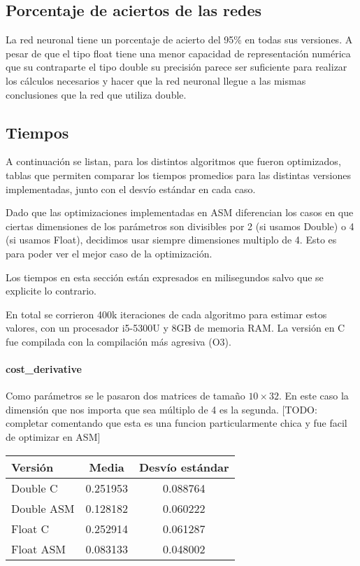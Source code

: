 \subsection{Porcentaje de aciertos de las redes}

La red neuronal tiene un porcentaje de acierto del 95\% en todas sus versiones. A pesar de que el tipo float tiene una menor capacidad de representación numérica que su contraparte el tipo double su precisión parece ser suficiente para realizar los cálculos necesarios y hacer que la red neuronal llegue a las mismas conclusiones que la red que utiliza double.


\subsection{Tiempos}

A continuación se listan, para los distintos algoritmos que fueron optimizados, tablas que permiten comparar los tiempos promedios para las distintas versiones implementadas, junto con el desvío estándar en cada caso.

Dado que las optimizaciones implementadas en ASM diferencian los casos en que ciertas dimensiones de los parámetros son divisibles por 2 (si usamos Double) o 4 (si usamos Float), decidimos usar siempre dimensiones multiplo de 4. Esto es para poder ver el mejor caso de la optimización.

Los tiempos en esta sección están expresados en milisegundos salvo que se explicite lo contrario.

En total se corrieron 400k iteraciones de cada algoritmo para estimar estos valores, con un procesador i5-5300U y 8GB de memoria RAM. La versión en C fue compilada con la compilación más agresiva (O3).

\paragraph{cost\_derivative}

Como parámetros se le pasaron dos matrices de tamaño $10\times32$. En este caso la dimensión que nos importa que sea múltiplo de 4 es la segunda. [TODO: completar comentando que esta es una funcion particularmente chica y fue facil de optimizar en ASM]

\begin{center}
    \begin{tabular}{| l | c | c |}
                \hline
    Versión & Media & Desvío estándar \\
                \hline
    Double C & 0.251953 & 0.088764 \\
    Double ASM & 0.128182 & 0.060222 \\
    Float C & 0.252914 & 0.061287 \\
    Float ASM  & 0.083133 & 0.048002 \\
                \hline
			
        \end{tabular}
\end{center}

